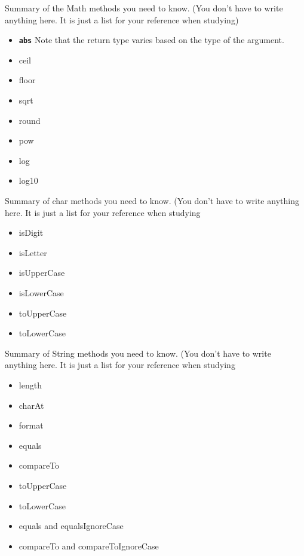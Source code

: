 \documentclass[letterpaper,11pt]{exam}
\begin{document}
\begin{questions}
\begin{samepage}
Summary of the Math methods you need to know. (You don't have to write anything here.  It is just a list for your reference when studying)
\begin{itemize}
  \item \texttt{\textbf{abs}}  Note that the return type varies based on the type of the argument.
  \item ceil
  \item floor
  \item sqrt
  \item round
  \item pow
  \item log
  \item log10
\end{itemize}


Summary of char methods you need to know. (You don't have to write anything here.  It is just a list for your reference when studying
\begin{itemize}
  \item isDigit
  \item isLetter
  \item isUpperCase
  \item isLowerCase
  \item toUpperCase
  \item toLowerCase
\end{itemize}

Summary of String methods you need to know. (You don't have to write anything here.  It is just a list for your reference when studying
\begin{itemize}
  \item length
  \item charAt
  \item format
  \item equals
  \item compareTo
  \item toUpperCase
  \item toLowerCase
  \item equals and equalsIgnoreCase
  \item compareTo and compareToIgnoreCase
\end{itemize}
\end{samepage}
 
\end{questions}
\end{document}
